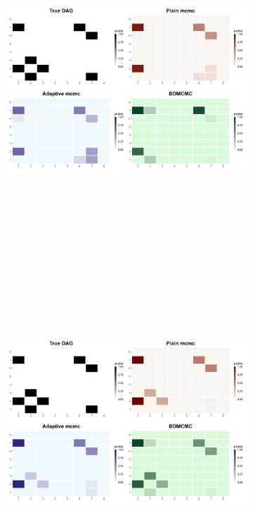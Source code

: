 \documentclass{report}
\begin{document}
\begin{figure}[!ht]
{\begin{minipage}{\textwidth}
			\begin{subfigure}[b]{0.45\textwidth}   
				\centering
				\includegraphics[width=\textwidth, height=12cm]{Figures/Overall_comparison/Random_dags/heat_dag_2_n_200.png}
				\label{fig:heatmaps-200}
			\end{subfigure}
			\hspace{0.35cm}  %
			\begin{subfigure}[b]{0.45\textwidth}   
				\centering
				\includegraphics[width=\textwidth, height=12cm]{Figures/Overall_comparison/Random_dags/heat_dag_2_n_500.png}

\end{subfigure}
\end{minipage}}
\end{figure}
\end{document}
